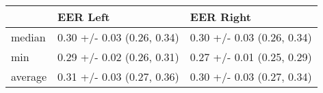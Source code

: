 \begin{tabular}{lll}
\toprule
{} &                    EER Left &                   EER Right \\
\midrule
median  &  0.30 +/- 0.03 (0.26, 0.34) &  0.30 +/- 0.03 (0.26, 0.34) \\
min     &  0.29 +/- 0.02 (0.26, 0.31) &  0.27 +/- 0.01 (0.25, 0.29) \\
average &  0.31 +/- 0.03 (0.27, 0.36) &  0.30 +/- 0.03 (0.27, 0.34) \\
\bottomrule
\end{tabular}
